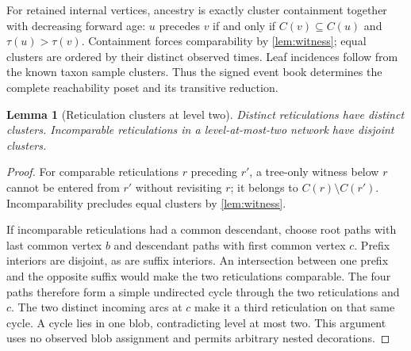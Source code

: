 \documentclass[11pt]{article}
\newtheorem{lemma}[theorem]{Lemma}
\begin{document}
For retained internal vertices, ancestry is exactly cluster containment together with decreasing forward age: $u$ precedes $v$ if and only if $C(v)\subseteq C(u)$ and $\tau(u)>\tau(v)$. Containment forces comparability by \cref{lem:witness}; equal clusters are ordered by their distinct observed times. Leaf incidences follow from the known taxon sample clusters. Thus the signed event book determines the complete reachability poset and its transitive reduction.

\begin{lemma}[Reticulation clusters at level two]
\label{lem:retic-laminar}
Distinct reticulations have distinct clusters. Incomparable reticulations in a level-at-most-two network have disjoint clusters.
\end{lemma}
\begin{proof}
For comparable reticulations $r$ preceding $r'$, a tree-only witness below $r$ cannot be entered from $r'$ without revisiting $r$; it belongs to $C(r)\setminus C(r')$. Incomparability precludes equal clusters by \cref{lem:witness}.

If incomparable reticulations had a common descendant, choose root paths with last common vertex $b$ and descendant paths with first common vertex $c$. Prefix interiors are disjoint, as are suffix interiors. An intersection between one prefix and the opposite suffix would make the two reticulations comparable. The four paths therefore form a simple undirected cycle through the two reticulations and $c$. The two distinct incoming arcs at $c$ make it a third reticulation on that same cycle. A cycle lies in one blob, contradicting level at most two. This argument uses no observed blob assignment and permits arbitrary nested decorations.
\end{proof}
\end{document}
